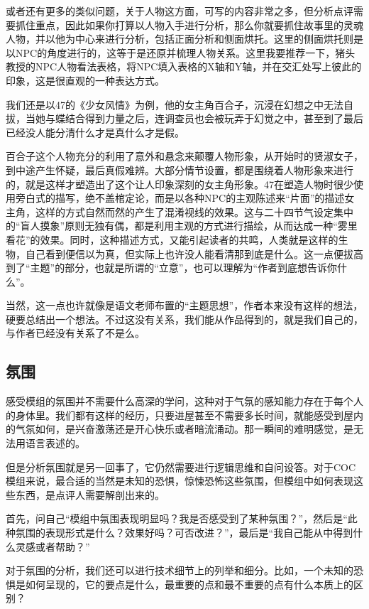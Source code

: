 \documentclass[a4paper,zihao=-4,notitlepage,twoside,openright]{ctexart}
\begin{document}
或者还有更多的类似问题，关于人物这方面，可写的内容非常之多，但分析点评需要抓住重点，因此如果你打算以人物入手进行分析，那么你就要抓住故事里的灵魂人物，并以他为中心来进行分析，包括正面分析和侧面烘托。这里的侧面烘托则是以NPC的角度进行的，这等于是还原并梳理人物关系。这里我要推荐一下，猪头教授的NPC人物看法表格，将NPC填入表格的X轴和Y轴，并在交汇处写上彼此的印象，这是很直观的一种表达方式。

我们还是以47的《少女风情》为例，他的女主角百合子，沉浸在幻想之中无法自拔，当她与蝶结合得到力量之后，连调查员也会被玩弄于幻觉之中，甚至到了最后已经没人能分清什么才是真什么才是假。

百合子这个人物充分的利用了意外和悬念来颠覆人物形象，从开始时的贤淑女子，到中途产生怀疑，最后真假难辨。大部分情节设置，都是围绕着人物形象来进行的，就是这样才塑造出了这个让人印象深刻的女主角形象。47在塑造人物时很少使用旁白式的描写，绝不盖棺定论，而是以各种NPC的主观陈述来“片面”的描述女主角，这样的方式自然而然的产生了混淆视线的效果。这与二十四节气设定集中的“盲人摸象”原则无独有偶，都是利用主观的方式进行描绘，从而达成一种“雾里看花”的效果。同时，这种描述方式，又能引起读者的共鸣，人类就是这样的生物，自己看到便信以为真，但实际上也许没人能看清那到底是什么。这一点便拔高到了“主题”的部分，也就是所谓的“立意”，也可以理解为“作者到底想告诉你什么”。

当然，这一点也许就像是语文老师布置的“主题思想”，作者本来没有这样的想法，硬要总结出一个想法。不过这没有关系，我们能从作品得到的，就是我们自己的，与作者已经没有关系了不是么。

\subsection{氛围}

感受模组的氛围并不需要什么高深的学问，这种对于气氛的感知能力存在于每个人的身体里。我们都有这样的经历，只要进屋甚至不需要多长时间，就能感受到屋内的气氛如何，是兴奋激荡还是开心快乐或者暗流涌动。那一瞬间的难明感觉，是无法用语言表述的。

但是分析氛围就是另一回事了，它仍然需要进行逻辑思维和自问设答。对于COC模组来说，最合适的当然是未知的恐惧，惊悚恐怖这些氛围，但模组中如何表现这些东西，是点评人需要解剖出来的。

首先，问自己“模组中氛围表现明显吗？我是否感受到了某种氛围？”，然后是“此种氛围的表现形式是什么？效果好吗？可否改进？”，最后是“我自己能从中得到什么灵感或者帮助？”

对于氛围的分析，我们还可以进行技术细节上的列举和细分。比如，一个未知的恐惧是如何呈现的，它的要点是什么，最重要的点和最不重要的点有什么本质上的区别？
\end{document}
